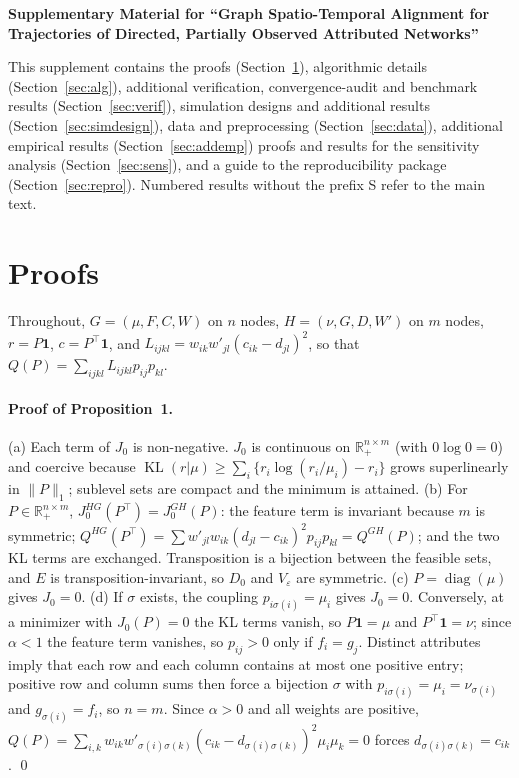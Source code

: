 \documentclass[12pt]{article}
\newcommand{\KL}{\operatorname{KL}}
\newcommand{\R}{\mathbb{R}}
\begin{document}
\def\spacingset#1{\renewcommand{\baselinestretch}{#1}\small\normalsize}\spacingset{1}

\begin{center}
{\LARGE\bf Supplementary Material for ``Graph Spatio-Temporal Alignment for Trajectories of Directed, Partially Observed Attributed Networks''}
\end{center}
\bigskip

\noindent This supplement contains the proofs (Section~\ref{sec:proofs}), algorithmic details (Section~\ref{sec:alg}), additional verification, convergence-audit and benchmark results (Section~\ref{sec:verif}), simulation designs and additional results (Section~\ref{sec:simdesign}), data and preprocessing (Section~\ref{sec:data}), additional empirical results (Section~\ref{sec:addemp}) proofs and results for the sensitivity analysis (Section~\ref{sec:sens}), and a guide to the reproducibility package (Section~\ref{sec:repro}). Numbered results without the prefix S refer to the main text.

\spacingset{1.45}

\section{Proofs}\label{sec:proofs}

Throughout, $G=(\mu,F,C,W)$ on $n$ nodes, $H=(\nu,G,D,W')$ on $m$ nodes, $r=P\mathbf 1$, $c=P^\top\mathbf1$, and $L_{ijkl}=w_{ik}w'_{jl}(c_{ik}-d_{jl})^2$, so that $Q(P)=\sum_{ijkl}L_{ijkl}p_{ij}p_{kl}$.

\paragraph{Proof of Proposition~1.}
(a) Each term of $J_0$ is non-negative. $J_0$ is continuous on $\R_+^{n\times m}$ (with $0\log0=0$) and coercive because $\KL(r|\mu)\ge\sum_i\{r_i\log(r_i/\mu_i)-r_i\}$ grows superlinearly in $\|P\|_1$; sublevel sets are compact and the minimum is attained. (b) For $P\in\R_+^{n\times m}$, $J^{HG}_0(P^\top)=J^{GH}_0(P)$: the feature term is invariant because $m$ is symmetric; $Q^{HG}(P^\top)=\sum w'_{jl}w_{ik}(d_{jl}-c_{ik})^2p_{ij}p_{kl}=Q^{GH}(P)$; and the two KL terms are exchanged. Transposition is a bijection between the feasible sets, and $E$ is transposition-invariant, so $D_0$ and $V_\varepsilon$ are symmetric. (c) $P=\operatorname{diag}(\mu)$ gives $J_0=0$. (d) If $\sigma$ exists, the coupling $p_{i\sigma(i)}=\mu_i$ gives $J_0=0$. Conversely, at a minimizer with $J_0(P)=0$ the KL terms vanish, so $P\mathbf1=\mu$ and $P^\top\mathbf1=\nu$; since $\alpha<1$ the feature term vanishes, so $p_{ij}>0$ only if $f_i=g_j$. Distinct attributes imply that each row and each column contains at most one positive entry; positive row and column sums then force a bijection $\sigma$ with $p_{i\sigma(i)}=\mu_i=\nu_{\sigma(i)}$ and $g_{\sigma(i)}=f_i$, so $n=m$. Since $\alpha>0$ and all weights are positive, $Q(P)=\sum_{i,k}w_{ik}w'_{\sigma(i)\sigma(k)}(c_{ik}-d_{\sigma(i)\sigma(k)})^2\mu_i\mu_k=0$ forces $d_{\sigma(i)\sigma(k)}=c_{ik}$. \qed
\end{document}
